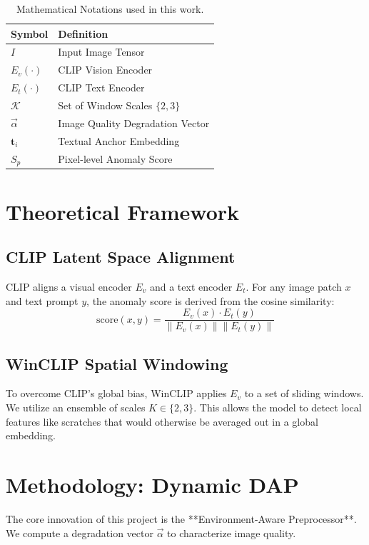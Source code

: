 \documentclass[10pt,twocolumn]{article}
\begin{document}
\begin{table}[h]
\centering
\small
\begin{tabular}{ll}
\toprule
\textbf{Symbol} & \textbf{Definition} \\ \midrule
$I$ & Input Image Tensor \\
$E_v(\cdot)$ & CLIP Vision Encoder \\
$E_t(\cdot)$ & CLIP Text Encoder \\
$\mathcal{K}$ & Set of Window Scales $\{2, 3\}$ \\
$\vec{\alpha}$ & Image Quality Degradation Vector \\
$\mathbf{t}_{i}$ & Textual Anchor Embedding \\
$S_{p}$ & Pixel-level Anomaly Score \\ \bottomrule
\end{tabular}
\caption{Mathematical Notations used in this work.}
\end{table}

\section{Theoretical Framework}
\subsection{CLIP Latent Space Alignment}
CLIP aligns a visual encoder $E_v$ and a text encoder $E_t$. For any image patch $x$ and text prompt $y$, the anomaly score is derived from the cosine similarity:
\begin{equation}
\text{score}(x, y) = \frac{E_v(x) \cdot E_t(y)}{\|E_v(x)\| \|E_t(y)\|}
\end{equation}

\subsection{WinCLIP Spatial Windowing}
To overcome CLIP's global bias, WinCLIP applies $E_v$ to a set of sliding windows. We utilize an ensemble of scales $K \in \{2, 3\}$. This allows the model to detect local features like scratches that would otherwise be averaged out in a global embedding.

\section{Methodology: Dynamic DAP}
The core innovation of this project is the **Environment-Aware Preprocessor**. We compute a degradation vector $\vec{\alpha}$ to characterize image quality.
\end{document}
